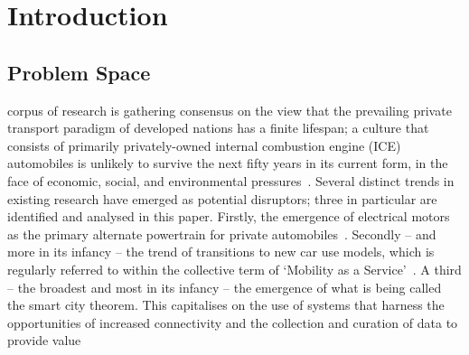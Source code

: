 \documentclass[journal]{IEEEtran}
\begin{document}
%
\IEEEpeerreviewmaketitle



\section{Introduction}\label{intro}
% 
% 
% 
% 

\subsection{Problem Space}

 corpus of research is gathering consensus on
the view that the prevailing private transport paradigm of developed
nations has a finite lifespan; a culture that consists of primarily
privately-owned internal combustion engine (ICE) automobiles is
unlikely to survive the next fifty years in its current form, in the
face of economic, social, and environmental
pressures~\cite{lerner:2011,van-audenhove-et-al:2014,black-et-al:2016}.
Several distinct trends in existing research have emerged as potential
disruptors; three in particular are identified and analysed in this
paper. Firstly, the emergence of electrical motors as the
primary alternate powertrain for private
automobiles~\cite{paffumi-et-al:2015,gnann-et-al:2015}.  Secondly --
and more in its infancy -- the trend of transitions to new car use
models, which is regularly referred to within the collective term of
`Mobility as a Service'~\cite{tscatapult:2016}. A third -- the
broadest and most in its infancy -- the emergence of what is being
called the smart city theorem. This capitalises on the use of systems
that harness the opportunities of increased connectivity and the
collection and curation of data to provide
value~\cite{townsend:2013,cosgrave-et-al:2013,ibm:2014} 
\end{document}
